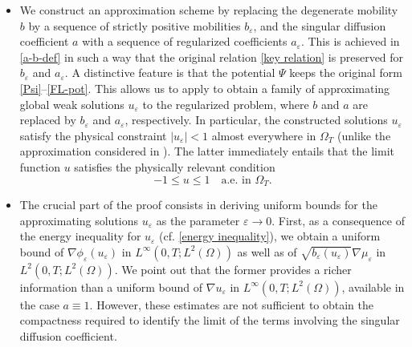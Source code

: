 \documentclass[11pt,  reqno]{amsart}%
\theoremstyle{plain}
\theoremstyle{definition}
\theoremstyle{remark}
\numberwithin{equation}{section}
\newcommand{\ve}{\varepsilon}
\begin{document}
\begin{itemize}
\item[2.] We construct an approximation scheme 
by replacing the degenerate mobility $b$ by a sequence of strictly positive mobilities $b_\ve$, and the singular diffusion coefficient $a$ with a sequence of regularized coefficients $a_\ve$. This is achieved in \eqref{a-b-def} in such a way that the original relation  \eqref{key relation} is preserved for $b_\ve$ and $a_\ve$. A distinctive feature is that the potential $\Psi$ keeps the original form \eqref{Psi}--\eqref{FL-pot}. This allows us to apply \cite[Theorem 1.3]{CGGS2025} to obtain a family of approximating global weak solutions $u_\ve$ to the regularized problem, where $b$ and $a$ are replaced by $b_\ve$ and $a_\ve$, respectively. In particular, the constructed solutions $u_{\ve}$ satisfy the physical constraint $|u_{\ve}|<1$ almost everywhere in $\Omega_T$ (unlike the approximation considered in \cite{EG1996}). The latter immediately entails that the limit function $u$ satisfies the physically relevant condition
$$
 -1 \leq u \leq 1  \quad \mbox{a.e. in } \Omega_T.
 $$ 

\item[3.] The crucial part of the proof consists in deriving uniform bounds for the approximating solutions $u_\ve$ as the parameter $\varepsilon \to 0$. 
First, as a consequence of the energy inequality for $u_\ve$ (cf. \eqref{energy inequality}), we obtain a uniform bound of $\nabla \phi_\ve (u_\ve)$ in $L^\infty(0,T; L^2(\Omega))$ as well as of $\sqrt{b_\ve(u_\ve)} \nabla \mu_\ve$ in $L^2(0,T; L^2(\Omega))$. We point out that the former provides a richer information than a uniform bound of $\nabla u_\ve$ in $L^\infty(0,T; L^2(\Omega))$, available in the case $a\equiv 1$.
However, these estimates are not sufficient to obtain the compactness required to identify the limit of the terms involving the singular diffusion coefficient.


\end{itemize}
\end{document}
